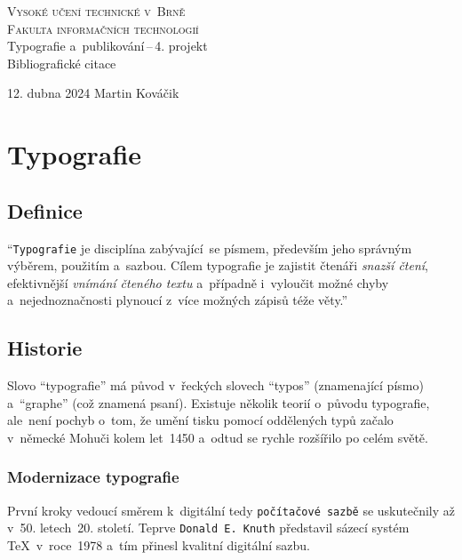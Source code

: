 \documentclass[a4paper, 11pt]{article}
\begin{document}
\begin{titlepage}
    \begin{center}
    \Huge\textsc{Vysoké učení technické v~Brně\\}
        \huge \textsc{Fakulta informačních technologií}\\
        \LARGE{Typografie a~publikování\,--\,4. projekt}\\
        \Huge{Bibliografické citace}
        
        {\Large 12. dubna 2024 \hfill Martin Kováčik}
        
    \end{center}
\end{titlepage}

\section{Typografie}

\subsection{Definice}
\enquote{\texttt{Typografie} je disciplína zabývající~se písmem, především jeho správným výběrem, použitím a~sazbou. Cílem typografie je zajistit čtenáři \emph{snazší čtení}, efektivnější \emph{vnímání čteného textu} a~případně i~vyloučit možné chyby a~nejednoznačnosti plynoucí z~více možných zápisů téže věty.}\cite{Strafelda}

\subsection{Historie}
Slovo \enquote{typografie} má původ v~řeckých slovech \enquote{typos} (znamenající písmo) a~\enquote{graphe} (což znamená psaní). Existuje několik teorií o~původu typografie, ale~není pochyb o~tom, že umění tisku pomocí oddělených typů začalo v~německé Mohuči kolem let~1450 a~odtud se rychle rozšířilo po celém světě.\cite{GressEdmundG1917}

\subsubsection{Modernizace typografie}
První kroky vedoucí směrem k~digitální tedy \texttt{počítačové sazbě} se uskutečnily až v~50. letech~20. století. Teprve \texttt{Donald E. Knuth} představil sázecí systém \TeX~v~roce~1978 a~tím přinesl kvalitní digitální sazbu.\cite{inproceedings}
\end{document}
